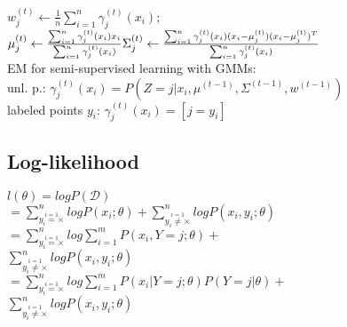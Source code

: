 $w_j^{(t)} \leftarrow \frac{1}{n} \sum_{i=1}^n \gamma_j^{(t)} (x_i)$;  %
$\mu_j^{(t)} \leftarrow \frac{\sum_{i=1}^n \gamma_j^{(t)} (x_i) x_i}{\sum_{i=1}^n \gamma_j^{(t)} (x_i)}\\ %
\Sigma_j^{(t)} \leftarrow \frac{\sum_{i=1}^n \gamma_j^{(t)}(x_i) (x_i - \mu_j^{(t)}) (x_i - \mu_j^{(t)})^T}{\sum_{i=1}^n \gamma_j^{(t)}(x_i)}$\\ %
EM for semi-supervised learning with GMMs:\\
unl. p.: $\gamma_j^{(t)}(x_i) = P(Z=j|x_i, \mu^{(t-1)}, \Sigma^{(t-1)}, w^{(t-1)})$\\
labeled points $y_i$: $\gamma_j^{(t)}(x_i) = [j = y_i]$


\iffalse
\subsection*{Log-likelihood}
$l(\theta) = log P(\mathcal{D})$ \\
$=\sum_{\overset{i=1}{y_i=\times}}^n log P(x_i;\theta) + \sum_{\overset{i=1}{y_i\not=\times}}^n log P(x_i,y_i;\theta)$\\
$=\sum_{\overset{i=1}{y_i=\times}}^n log \sum_{i=1}^m P(x_i, Y=j;\theta) +$\\
$ \sum_{\overset{i=1}{y_i\not=\times}}^n log P(x_i,y_i;\theta)$\\
$=\sum_{\overset{i=1}{y_i=\times}}^n log \sum_{i=1}^m P(x_i|Y=j;\theta)P(Y=j|\theta) +$\\
$ \sum_{\overset{i=1}{y_i\not=\times}}^n log P(x_i,y_i;\theta)$

